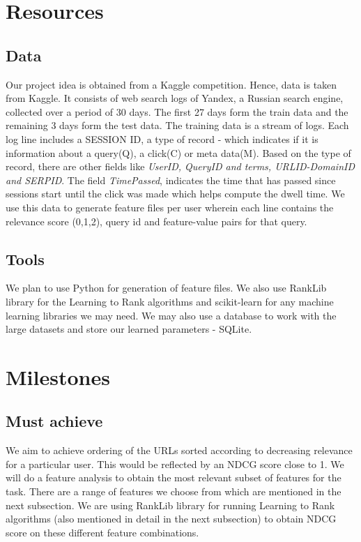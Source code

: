 \documentclass[11pt]{article}
\begin{document}
\section{Resources}
\subsection{Data}
Our project idea is obtained from a Kaggle competition. Hence, data is taken from Kaggle. It consists of web search logs of Yandex, a Russian search engine, collected over a period of 30 days. The first 27 days form the train data and the remaining 3 days form the test data. \newline
The training data is a stream of logs. Each log line includes a SESSION ID, a type of record  - which indicates if it is information about a query(Q), a click(C) or meta data(M). Based on the type of record, there are other fields like \textsl{UserID, QueryID and terms, URLID-DomainID and SERPID}. The field \textsl{TimePassed}, indicates the time that has passed since sessions start until the click was made which helps compute the dwell time. We use this data to generate feature files per user wherein each line contains the relevance score (0,1,2), query id and feature-value pairs for that query.

\subsection{Tools}
We plan to use Python for generation of feature files. We also use RankLib library for the Learning to Rank algorithms and scikit-learn for any machine learning libraries we may need. We may also use a database to work with the large datasets and store our learned parameters - SQLite.

\section{Milestones}
\subsection{Must achieve}
We aim to achieve ordering of the URLs sorted according to decreasing relevance for a particular user. This would be reflected by an NDCG score close to 1. We will do a feature analysis to obtain the most relevant subset of features for the task.  There are a range of features we choose from which are mentioned in the next subsection. We are using  RankLib library for running Learning to Rank algorithms (also mentioned in detail in the next subsection) to obtain NDCG score on these different feature combinations. 
\end{document}
